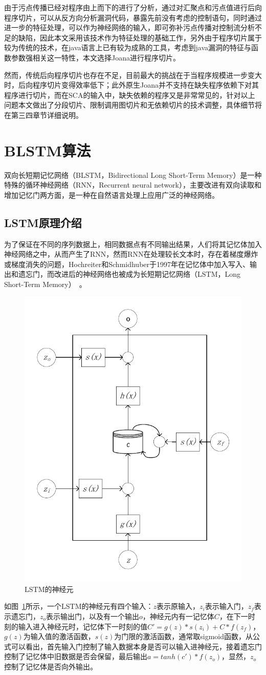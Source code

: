 由于污点传播已经对程序由上而下的进行了分析，通过对汇聚点和污点值进行后向程序切片，可以从反方向分析漏洞代码，暴露先前没有考虑的控制语句，同时通过进一步的特征处理，可以作为神经网络的输入，即可弥补污点传播对控制流分析不足的缺陷，因此本文采用该技术作为特征处理的基础工作，另外由于程序切片属于较为传统的技术，在java语言上已有较为成熟的工具，考虑到java漏洞的特征与函数参数强相关这一特性，本文选择Joana进行程序切片。

然而，传统后向程序切片也存在不足，目前最大的挑战在于当程序规模进一步变大时，后向程序切片变得效率低下；此外原生Joana并不支持在缺失程序依赖下对其程序进行切片，而在SCA的输入中，缺失依赖的程序又是非常常见的，针对以上问题本文做出了分段切片、限制调用图切片和无依赖切片的技术调整，具体细节将在第三四章节详细说明。\\

\section{BLSTM算法}
双向长短期记忆网络（BLSTM，Bidirectional Long Short-Term Memory）是一种特殊的循环神经网络（RNN，Recurrent neural network），主要改进有双向读取和增加记忆门两方面，是一种在自然语言处理上应用广泛的神经网络。\\

\subsection{LSTM原理介绍}
为了保证在不同的序列数据上，相同数据点有不同输出结果，人们将其记忆体加入神经网络之中，从而产生了RNN，然而RNN在处理较长文本时，存在着梯度爆炸或梯度消失的问题，Hochreiter和Schmidhuber于1997年在记忆体中加入写入、输出和遗忘门，而改进后的神经网络也被成为长短期记忆网络（LSTM，Long Short-Term Memory）~\cite{lstm:1997}。

\begin{figure}[htb]
	\centering
	\includegraphics[width=0.4\linewidth]{FIGs/chapter2/lstm_cell.pdf}
	\caption{LSTM的神经元}\label{lstmcell}
\end{figure}
如图~\ref{lstmcell}所示，一个LSTM的神经元有四个输入：$z$表示原输入，$z_i$表示输入门，$z_f$表示遗忘门，$z_o$表示输出门，以及有一个输出$o$，神经元内有一记忆体$C$，在下一时刻的输入进入神经元时，记忆体下一时刻的值$C'=g(z)*s(z_i)+C*f(z_f)$，$g(z)$为输入值的激活函数，$s(z)$为门限的激活函数，通常取sigmoid函数，从公式可以看出，首先输入门控制了输入数据本身是否可以输入进神经元，接着遗忘门控制了记忆体中旧数据是否会保留，最后输出$a=tanh(c')*f(z_o)$，显然，$z_o$控制了记忆体是否向外输出。

